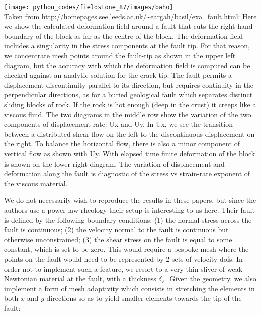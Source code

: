 \begin{center}
\texttt{[image: python\_codes/fieldstone\_87/images/baho]}\\
{\captionfont Taken from 
\url{http://homepages.see.leeds.ac.uk/~eargah/basil/exa_fault.html}: 
Here we show the calculated deformation field around a fault that cuts the right 
hand boundary of the block as far as the centre of the block.  The deformation field 
includes a singularity in the stress components at the fault tip.  For that reason, 
we concentrate mesh points around the fault-tip as shown in the upper left diagram, 
but the accuracy with which the deformation field is computed can be checked against 
an analytic solution for the crack tip.  The fault permits a displacement discontinuity 
parallel to its direction, but requires continuity in the perpendicular directions, 
as for a buried geological fault which separates distinct sliding blocks of rock.  
If the rock is hot enough (deep in the crust) it creeps like a viscous fluid. 
The two diagrams in the middle row show the variation of the two components of displacement rate: 
Ux and Uy.  In Ux, we see the transition between a distributed shear flow on the left to the 
discontinuous displacement on the right.  To balance the horizontal flow, there is also a minor 
component of vertical flow as shown with Uy.  With elapsed time finite deformation of the block 
is shown on the lower right diagram.  The variation of displacement and deformation along the fault 
is diagnostic of the stress vs strain-rate exponent of the viscous material. 
}
\end{center}

We do not necessarily wish to reproduce the results in these papers, but since the authors use a 
power-law rheology their setup is interesting to us here. 
Their fault is defined by the following boundary conditions:
(1) the normal stress across the fault is continuous;
(2) the velocity normal to the fault is continuous but
otherwise unconstrained;
(3) the shear stress on the fault is equal to some constant,
which is set to be zero.
This would require a bespoke mesh where the points on the fault would need to be represented by 2 sets
of velocity dofs. 
In order not to implement such a feature, we resort to a very thin sliver of weak Newtonian material 
at the fault, with a thickness $\delta_F$.
Given the geometry, we also implement a form of mesh adaptivity which consists in 
stretching the elements in both $x$ and $y$ directions so as to yield smaller 
elements towards the tip of the fault:

